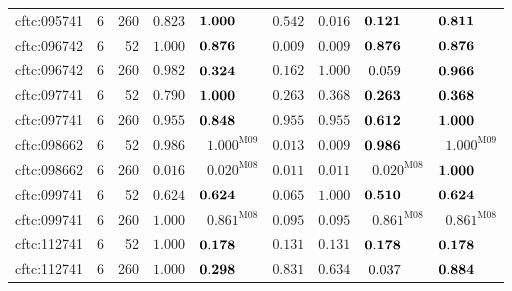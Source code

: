 \documentclass[10pt,a4paper]{article}
\begin{document}
\begin{longtable}{@{}lrrrrrrrr@{}}
cftc:095741 & 6 & 260 & $\mathbf{0.823}$ & $\mathbf{1.000}\hphantom{^{\mathrm{M00}}}$ & $\mathbf{0.542}$ & $0.016$ & $\mathbf{0.121}\hphantom{^{\mathrm{M00}}}$ & $\mathbf{0.811}\hphantom{^{\mathrm{M00}}}$ \\
cftc:096742 & 6 & 52 & $\mathbf{1.000}$ & $\mathbf{0.876}\hphantom{^{\mathrm{M00}}}$ & $0.009$ & $0.009$ & $\mathbf{0.876}\hphantom{^{\mathrm{M00}}}$ & $\mathbf{0.876}\hphantom{^{\mathrm{M00}}}$ \\
cftc:096742 & 6 & 260 & $\mathbf{0.982}$ & $\mathbf{0.324}\hphantom{^{\mathrm{M00}}}$ & $\mathbf{0.162}$ & $\mathbf{1.000}$ & $0.059\hphantom{^{\mathrm{M00}}}$ & $\mathbf{0.966}\hphantom{^{\mathrm{M00}}}$ \\
cftc:097741 & 6 & 52 & $\mathbf{0.790}$ & $\mathbf{1.000}\hphantom{^{\mathrm{M00}}}$ & $\mathbf{0.263}$ & $\mathbf{0.368}$ & $\mathbf{0.263}\hphantom{^{\mathrm{M00}}}$ & $\mathbf{0.368}\hphantom{^{\mathrm{M00}}}$ \\
cftc:097741 & 6 & 260 & $\mathbf{0.955}$ & $\mathbf{0.848}\hphantom{^{\mathrm{M00}}}$ & $\mathbf{0.955}$ & $\mathbf{0.955}$ & $\mathbf{0.612}\hphantom{^{\mathrm{M00}}}$ & $\mathbf{1.000}\hphantom{^{\mathrm{M00}}}$ \\
cftc:098662 & 6 & 52 & $\mathbf{0.986}$ & $\mathbf{1.000}^{\mathrm{M09}}$ & $0.013$ & $0.009$ & $\mathbf{0.986}\hphantom{^{\mathrm{M00}}}$ & $\mathbf{1.000}^{\mathrm{M09}}$ \\
cftc:098662 & 6 & 260 & $0.016$ & $0.020^{\mathrm{M08}}$ & $0.011$ & $0.011$ & $0.020^{\mathrm{M08}}$ & $\mathbf{1.000}\hphantom{^{\mathrm{M00}}}$ \\
cftc:099741 & 6 & 52 & $\mathbf{0.624}$ & $\mathbf{0.624}\hphantom{^{\mathrm{M00}}}$ & $0.065$ & $\mathbf{1.000}$ & $\mathbf{0.510}\hphantom{^{\mathrm{M00}}}$ & $\mathbf{0.624}\hphantom{^{\mathrm{M00}}}$ \\
cftc:099741 & 6 & 260 & $\mathbf{1.000}$ & $\mathbf{0.861}^{\mathrm{M08}}$ & $0.095$ & $0.095$ & $\mathbf{0.861}^{\mathrm{M08}}$ & $\mathbf{0.861}^{\mathrm{M08}}$ \\
cftc:112741 & 6 & 52 & $\mathbf{1.000}$ & $\mathbf{0.178}\hphantom{^{\mathrm{M00}}}$ & $\mathbf{0.131}$ & $\mathbf{0.131}$ & $\mathbf{0.178}\hphantom{^{\mathrm{M00}}}$ & $\mathbf{0.178}\hphantom{^{\mathrm{M00}}}$ \\
cftc:112741 & 6 & 260 & $\mathbf{1.000}$ & $\mathbf{0.298}\hphantom{^{\mathrm{M00}}}$ & $\mathbf{0.831}$ & $\mathbf{0.634}$ & $0.037\hphantom{^{\mathrm{M00}}}$ & $\mathbf{0.884}\hphantom{^{\mathrm{M00}}}$ \\

\end{longtable}
\end{document}
